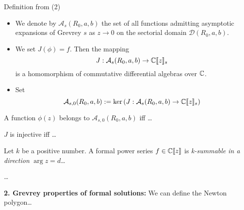 {  \begin{frame}{Definition from \cite{zbMATH00060600} (2)}
    \begin{itemize}
      \item We denote by $\mathcal{A}_s(R_0,a,b)$ the set of all functions
      admitting asymptotic expansions of Grevrey $s$ as $z\to 0$ on the
      sectorial domain $\mathcal{D}(R_0,a,b)$.
      \item We set $J(\phi)=f$. Then the mapping
      \[
      J: \mathcal{A}_s(R_0,a,b) \to \mathbb{C}\llbracket z\rrbracket_s
      \]
      is a homomorphism of commutative differential algebras over $\mathbb{C}$.
      \item Set
      \[
      \mathcal{A}_{s,0}(R_0,a,b):=
      \ker\left(J: \mathcal{A}_s(R_0,a,b) \to \mathbb{C}\llbracket z\rrbracket_s\right)
      \]
    \end{itemize}
    \begin{lem}[1.3]
      A function $\phi(z)$ belongs to $\mathcal{A}_{s,0}(R_0,a,b)$ iff \dots
    \end{lem}
    \begin{cor}[1.4]
      $J$ is injective iff \dots
    \end{cor}
    \begin{defn}[1.5]
      Let $k$ be a positive number. A formal power series $f\in\mathbb{C}\llbracket
      z\rrbracket$ is \emph{k-summable in a direction} $\arg z=d$\dots
    \end{defn}

    \dots

    \textbf{2. Grevrey properties of formal solutions:} We can define the
    Newton polygon\dots
  \end{frame}
}

